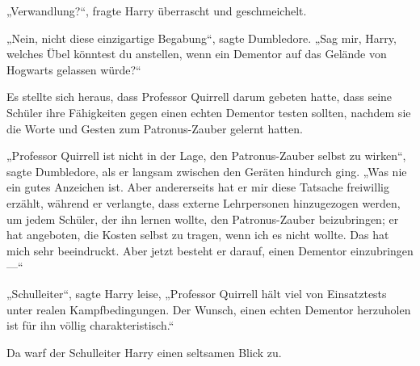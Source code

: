 „Verwandlung?“, fragte Harry überrascht und geschmeichelt.

„Nein, nicht diese einzigartige Begabung“, sagte Dumbledore. „Sag mir, Harry, welches Übel könntest du anstellen, wenn ein Dementor auf das Gelände von Hogwarts gelassen würde?“

\later

Es stellte sich heraus, dass Professor Quirrell darum gebeten hatte, dass seine Schüler ihre Fähigkeiten gegen einen echten Dementor testen sollten, nachdem sie die Worte und Gesten zum Patronus-Zauber gelernt hatten.

„Professor Quirrell ist nicht in der Lage, den Patronus-Zauber selbst zu wirken“, sagte Dumbledore, als er langsam zwischen den Geräten hindurch ging. „Was nie ein gutes Anzeichen ist. Aber andererseits hat er mir diese Tatsache freiwillig erzählt, während er verlangte, dass externe Lehrpersonen hinzugezogen werden, um jedem Schüler, der ihn lernen wollte, den Patronus-Zauber beizubringen; er hat angeboten, die Kosten selbst zu tragen, wenn ich es nicht wollte. Das hat mich sehr beeindruckt. Aber jetzt besteht er darauf, einen Dementor einzubringen—“

„Schulleiter“, sagte Harry leise, „Professor Quirrell hält viel von Einsatztests unter realen Kampfbedingungen. Der Wunsch, einen echten Dementor herzuholen ist für ihn völlig charakteristisch.“

Da warf der Schulleiter Harry einen seltsamen Blick zu.

